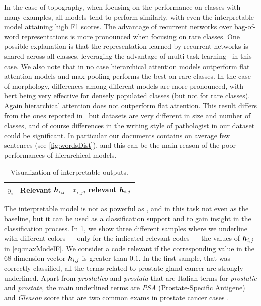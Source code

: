 In the case of topography, when focusing on the performance on classes
with many examples, all models tend to perform similarly, with even
the interpretable model attaining high F1 scores. The advantage of
recurrent networks over bag-of-word representations is more pronounced
when focusing on rare classes. One possible explanation is that the
representation learned by recurrent networks is shared across all
classes, leveraging the advantage of multi-task
learning~\cite{caruana1997multitask} in this case.  We also note that
in no case hierarchical attention models outperform flat attention
models and max-pooling performs the best on rare classes. In the case
of morphology, differences among different models are more pronounced,
with \ac{bert} being very effective for densely populated classes (but
not for rare classes). Again hierarchical attention does not
outperform flat attention. This result differs from the ones reported
in~\cite{gao_hierarchical_2018} but datasets are very different in
size and number of classes, and of course differences in the writing
style of pathologist in our dataset could be
significant. In particular our documents contains on average few
sentences (see \cref{fig:wordsDist}), and this can be the main reason
of the poor performances of hierarchical models.

\begin{table}
  \centering
  \ttfamily
  \scriptsize
  \caption{Visualization of interpretable outputs.}
  \label{tab:multiAttention1}
  \begin{tabular}{|c|c|c|}
    \hline
    $y_i$&\textrm{Relevant} $\bm{h}_{i,j}$&$x_{i,j}$\textrm{, relevant} $\bm{h}_{i,j}$\\
    \hline
    
    \hline
    
    \hline
    
    \hline
  \end{tabular}
\end{table}

The interpretable model is not as powerful as \maxp{}, and in this task
not even as the baseline, but it can be used as a
classification support and to 
gain insight in the classification process. In
\cref{tab:multiAttention1}, we show three different samples where we
underline with different colors --- only for the indicated relevant
codes --- the values of $\bm{h}_{i,j}$ in \eqref{eq:maxModelF}. We
consider a code relevant if the corresponding value in the
68-dimension vector $\bm{h}_{i,j}$ is greater than $0.1$. In the
first sample, that was correctly classified, all the terms related to
prostate gland cancer are strongly underlined. Apart from
\emph{prostatico} and \emph{prostata} that are Italian terms for
\emph{prostatic} and \emph{prostate}, the main underlined terms are
\emph{PSA} (Prostate-Specific Antigene) and \emph{Gleason} score that
are two common exams in prostate cancer cases
\cite{brimo2013prostate}.

